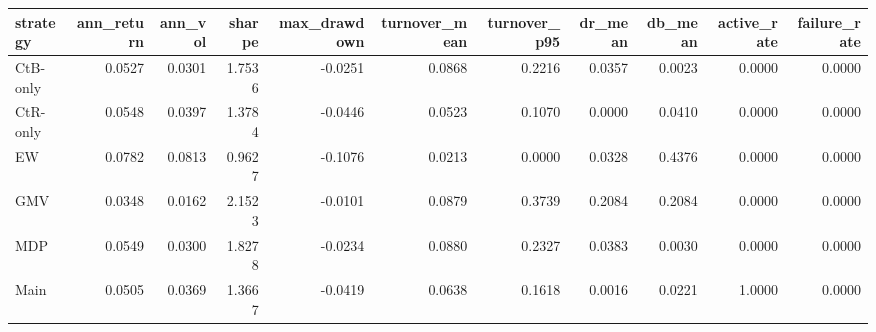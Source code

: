 \begin{tabular}{lrrrrrrrrrr}
\toprule
strategy & ann_return & ann_vol & sharpe & max_drawdown & turnover_mean & turnover_p95 & dr_mean & db_mean & active_rate & failure_rate \\
\midrule
CtB-only & 0.0527 & 0.0301 & 1.7536 & -0.0251 & 0.0868 & 0.2216 & 0.0357 & 0.0023 & 0.0000 & 0.0000 \\
CtR-only & 0.0548 & 0.0397 & 1.3784 & -0.0446 & 0.0523 & 0.1070 & 0.0000 & 0.0410 & 0.0000 & 0.0000 \\
EW & 0.0782 & 0.0813 & 0.9627 & -0.1076 & 0.0213 & 0.0000 & 0.0328 & 0.4376 & 0.0000 & 0.0000 \\
GMV & 0.0348 & 0.0162 & 2.1523 & -0.0101 & 0.0879 & 0.3739 & 0.2084 & 0.2084 & 0.0000 & 0.0000 \\
MDP & 0.0549 & 0.0300 & 1.8278 & -0.0234 & 0.0880 & 0.2327 & 0.0383 & 0.0030 & 0.0000 & 0.0000 \\
Main & 0.0505 & 0.0369 & 1.3667 & -0.0419 & 0.0638 & 0.1618 & 0.0016 & 0.0221 & 1.0000 & 0.0000 \\
\bottomrule
\end{tabular}
